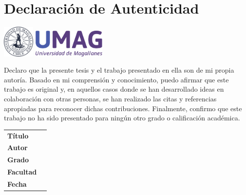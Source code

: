 \chapter{Declaración de Autenticidad}

\vspace{2cm}
\begin{flushleft}
	\includegraphics[height=1.6cm]{.cls_resources/img/umag_logo_old_blue.pdf}
	\hspace{1ex}
	\includegraphics[height=1.4cm]{.cls_resources/img/umag_logo.pdf}
\end{flushleft}
\vspace{1em}

Declaro que la presente tesis y el trabajo presentado en ella son de mi propia autoría. Basado en mi comprensión y conocimiento, puedo afirmar que este trabajo es original y, en aquellos casos donde se han desarrollado ideas en colaboración con otras personas, se han realizado las citas y referencias apropiadas para reconocer dichas contribuciones. Finalmente, confirmo que este trabajo no ha sido presentado para ningún otro grado o calificación académica.


\vspace{2.5cm}

\bgroup
\makeatletter
\begin{tabular}{ll}
	{\bfseries Título}   & \@title      \\
	{\bfseries Autor}    & \@author     \\
	{\bfseries Grado}    & \@degree     \\
	{\bfseries Facultad} & \@faculty    \\[0.7in]
	{\bfseries Fecha}    & \@degreedate \\
\end{tabular}\\[1cm]
\makeatother
\egroup